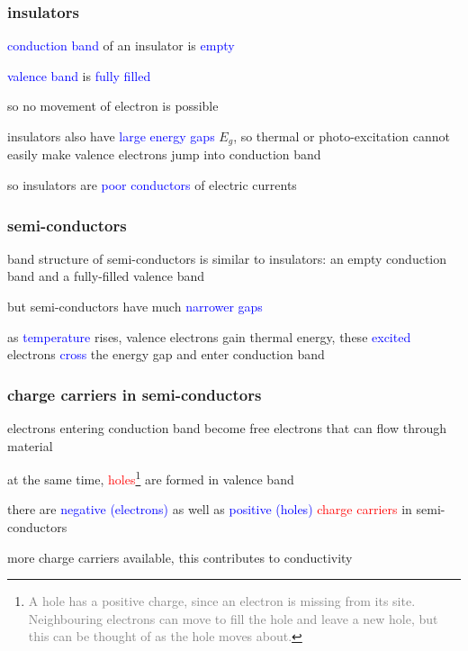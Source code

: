 \documentclass[12pt,xcolor=svgnames,handout]{beamer}
\newcommand{\tightframetitle}[1]{ %
\frametitle{#1}\vspace{-.6\baselineskip}}
\begin{document}
\begin{frame}
	\tightframetitle{insulators}
	
	\begin{block}{}
		\textcolor{blue}{conduction band} of an insulator is \textcolor{blue}{empty}
		
		\textcolor{blue}{valence band} is \textcolor{blue}{fully filled}
		
		so no movement of electron is possible
	\end{block}
	
	\begin{block}{}			
		insulators also have \textcolor{blue}{large energy gaps} $E_g$, so thermal or photo-excitation cannot easily make valence electrons jump into conduction band
		
		so insulators are \textcolor{blue}{poor conductors} of electric currents
	\end{block}
	
\end{frame}

\begin{frame}
	\tightframetitle{semi-conductors}
	
	\begin{block}{}
		band structure of semi-conductors is similar to insulators: an empty conduction band and a fully-filled valence band
		
		but semi-conductors have much \textcolor{blue}{narrower gaps}
	\end{block}
	
	\begin{block}{}			
		as \textcolor{blue}{temperature} rises, valence electrons gain thermal energy, these \textcolor{blue}{excited} electrons \textcolor{blue}{cross} the energy gap and enter conduction band
	\end{block}
	
\end{frame}

\begin{frame}
	\tightframetitle{charge carriers in semi-conductors}
	
	\begin{block}{}
		electrons entering conduction band become free electrons that can flow through material
		
		at the same time, \textcolor{red}{holes}\footnote{\textcolor{gray}{A hole has a positive charge, since an electron is missing from its site. Neighbouring electrons can move to fill the hole and leave a new hole, but this can be thought of as the hole moves about.}} are formed in valence band
	\end{block}
	
	\begin{block}{}			
		there are \textcolor{blue}{negative (electrons)} as well as \textcolor{blue}{positive (holes)} \textcolor{red}{charge carriers} in semi-conductors
		
		more charge carriers available, this contributes to conductivity
	\end{block}

\end{frame}
\end{document}
